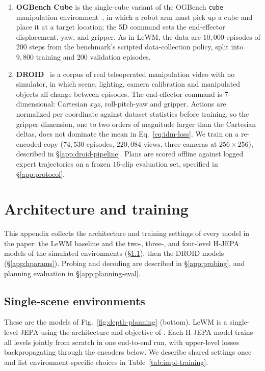 \begin{enumerate}[label=\alph*)]
\item \textbf{OGBench Cube} is the single-cube variant of the OGBench
\texttt{cube} manipulation environment~\citep{park2025ogbench}, in which a robot arm
must pick up a cube and place it at a target location; the 5D command sets the
end-effector displacement, yaw, and gripper. As in LeWM, the data are $10{,}000$
episodes of $200$ steps from the benchmark's scripted data-collection policy, split
into $9{,}800$ training and $200$ validation episodes.

\item \textbf{DROID}~\citep{khazatsky2024droid} is a corpus of real teleoperated
manipulation video with no simulator, in which scene, lighting, camera calibration and
manipulated objects all change between episodes. The end-effector command is
$7$-dimensional: Cartesian $xyz$, roll-pitch-yaw and gripper. Actions are normalized per
coordinate against dataset statistics before training, so the gripper dimension, one to two
orders of magnitude larger than the Cartesian deltas, does not dominate the mean in
Eq.~\eqref{eq:idm-loss}. We train on a re-encoded copy ($74{,}530$ episodes, $220{,}084$
views, three cameras at $256{\times}256$), described in \S\ref{app:droid-pipeline}.
Plans are scored offline against logged expert
trajectories on a frozen $16$-clip evaluation set, specified in \S\ref{app:protocol}.
\end{enumerate}

\section{Architecture and training}
\label{app:implementation}

This appendix collects the architecture and training settings of every model in the
paper: the LeWM baseline and the two-, three-, and four-level H-JEPA models of the
simulated environments (\S\ref{app:implementation-sim}), then the DROID models
(\S\ref{app:hparams}). Probing and decoding are
described in \S\ref{app:probing}, and planning evaluation in
\S\ref{app:planning-eval}.

\subsection{Single-scene environments}
\label{app:implementation-sim}

These are the models of Fig.~\ref{fig:depth-planning} (bottom). LeWM is a single-level JEPA using
the architecture and objective of \citet{maes2026lewm}. Each H-JEPA model trains all
levels jointly from scratch in one end-to-end run, with upper-level losses
backpropagating through the encoders below. We describe shared settings once and
list environment-specific choices in Table~\ref{tab:impl-training}.

